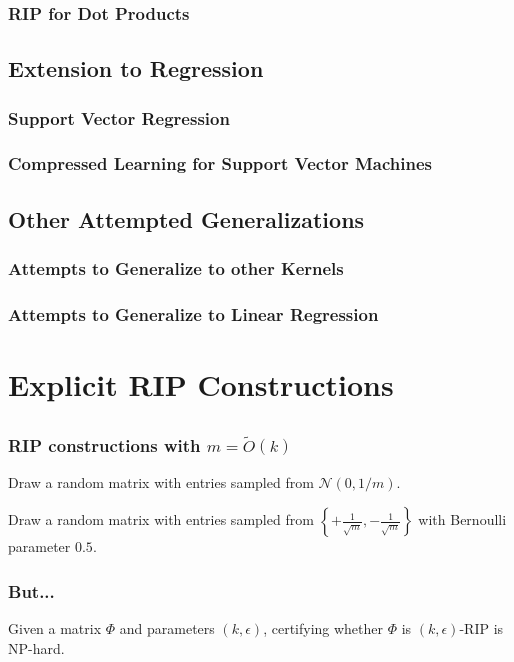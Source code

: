 \documentclass[aspectratio=34]{beamer}
\begin{document}
\begin{frame}
    \frametitle{RIP for Dot Products}
\end{frame}

\subsection{Extension to Regression}

\begin{frame}
    \frametitle{Support Vector Regression}
\end{frame}

\begin{frame}
    \frametitle{Compressed Learning for Support Vector Machines}
\end{frame}

\subsection{Other Attempted Generalizations}

\begin{frame}
    \frametitle{Attempts to Generalize to other Kernels}
\end{frame}

\begin{frame}
    \frametitle{Attempts to Generalize to Linear Regression}
\end{frame}

\section{Explicit RIP Constructions}

\subsection{}
\begin{frame}
\frametitle{RIP constructions with $m = \tilde{O}(k)$}
Draw a random matrix with entries sampled from $\mathcal{N}(0,1/m)$.

Draw a random matrix with entries sampled from $\left\{+\frac{1}{\sqrt{m}}, -\frac{1}{\sqrt{m}}\right\}$ with Bernoulli parameter $0.5$. 
\end{frame}

\begin{frame}
\frametitle{But...}
\begin{theorem}
Given a matrix $\Phi$ and parameters $(k,\epsilon)$, certifying whether $\Phi$ is $(k,\epsilon)$-RIP is NP-hard. 
\end{theorem}
\end{frame}
\end{document}
